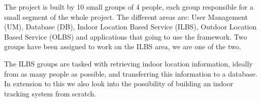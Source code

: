 The project is built by 10 small groups of 4 people, each group responsible for a small segment of the whole project. The different areas are: User Management (UM), Database (DB), Indoor Location Based Service (ILBS), Outdoor Location Based Service (OLBS) and applications that going to use the framework. Two groups have been assigned to work on the ILBS area, we are one of the two.

The ILBS groups are tasked with retrieving indoor location information, ideally from as many people as possible, and transferring this information to a database. In extension to this we also look into the possibility of building an indoor tracking system from scratch.